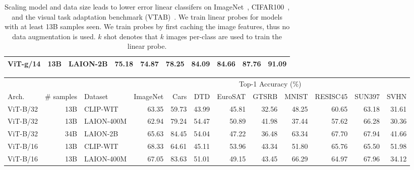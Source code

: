 \begin{appendix}
\begin{table}
\begin{tabular}{lllrrrrrrr}
           ViT-g/14 &                 13B &         LAION-2B &    75.18 &                          74.87 &                          78.25 &                          84.09 &             84.66 &             87.76 &             91.09 \\
\bottomrule
\end{tabular}
\caption{
Scaling model and data size leads to lower error linear classifers on ImageNet~\cite{Deng2009a}, CIFAR100~\cite{Krizhevsky2009}, and the visual task adaptation benchmark (VTAB)~\cite{zhai2019large}.
     We train linear probes for models with at least 13B samples seen.
     We train probes by first caching the image features, thus no data augmentation is used.
     $k$ shot denotes that $k$ images per-class are used to train the linear probe.
     }
    \label{tab:lp}
\end{table}

\begin{table}
\scriptsize
\centering
\setlength\tabcolsep{3pt}
\begin{tabular}{lrlrrrrrrrrr}     
\toprule                           

& & & \multicolumn{9}{c}{Top-1 Accuracy (\%)} \\
Arch. & \# samples &  Dataset & ImageNet & Cars & DTD & EuroSAT & GTSRB & MNIST & RESISC45 & SUN397 & SVHN \\                                   
\midrule                                                                                                                                                                           ViT-B/32 &          13B &    CLIP-WIT &         63.35 &     59.73 &    43.99 &        45.81 &      32.56 &      48.25 &         60.65 &       63.18 &     31.61 \\                                  
 ViT-B/32 &          13B &  LAION-400M &         62.94 &     79.24 &    54.47 &        50.89 &      41.98 &      37.44 &         57.62 &       66.28 &     30.36 \\                                  
ViT-B/32 &          34B &    LAION-2B &         65.63 &     84.45 &    54.04 &        47.22 &      36.48 &      63.34 &         67.70 &       67.94 &     41.66 \\                                   
ViT-B/16 &          13B &    CLIP-WIT &         68.33 &     64.61 &    45.11 &        53.96 &      43.34 &      51.80 &         65.76 &       65.50 &     51.98 \\                                  
ViT-B/16 &          13B &  LAION-400M &         67.05 &     83.63 &    51.01 &        49.15 &      43.45 &      66.29 &         64.97 &       67.96 &     34.12 \\          


\end{tabular}
\end{table}
\end{appendix}
